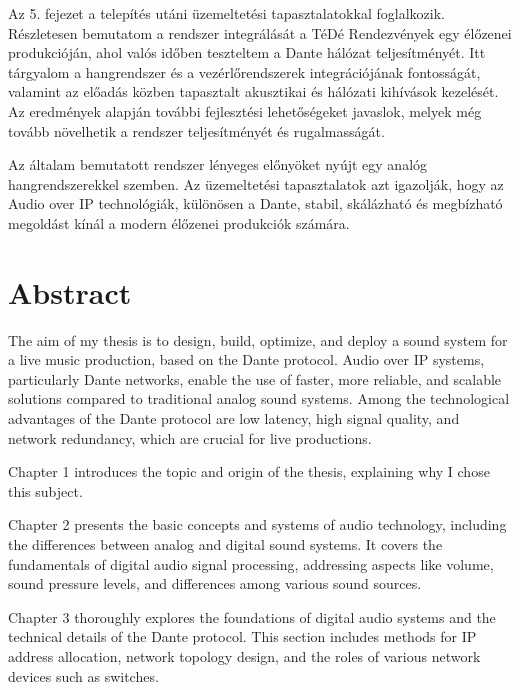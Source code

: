 Az 5. fejezet a telepítés utáni üzemeltetési tapasztalatokkal 
foglalkozik. Részletesen bemutatom a rendszer integrálását a 
TéDé Rendezvények egy élőzenei produkcióján, ahol 
valós időben teszteltem a Dante hálózat teljesítményét. 
Itt tárgyalom a hangrendszer és a vezérlőrendszerek 
integrációjának fontosságát, valamint az előadás közben 
tapasztalt akusztikai és hálózati kihívások kezelését. 
Az eredmények alapján további fejlesztési lehetőségeket 
javaslok, melyek még tovább növelhetik a rendszer teljesítményét és rugalmasságát.

Az általam bemutatott rendszer lényeges előnyöket nyújt egy analóg 
hangrendszerekkel szemben.
Az üzemeltetési tapasztalatok azt igazolják, hogy 
az Audio over IP technológiák, különösen a Dante, 
stabil, skálázható és megbízható megoldást 
kínál a modern élőzenei produkciók számára.


\vfill
\selectenglish


\chapter*{Abstract}

The aim of my thesis is to design, build, optimize, and deploy a sound system 
for a live music production, based on the Dante protocol. 
Audio over IP systems, particularly Dante networks, enable the use 
of faster, more reliable, and scalable solutions compared to 
traditional analog sound systems. Among the technological 
advantages of the Dante protocol are low latency, high signal quality, 
and network redundancy, which are crucial for live productions.

Chapter 1 introduces the topic and origin of the thesis, 
explaining why I chose this subject.

Chapter 2 presents the basic concepts and systems of audio technology, 
including the differences between analog and digital sound systems. 
It covers the fundamentals of digital audio signal processing, 
addressing aspects like volume, sound pressure levels, and differences 
among various sound sources.

Chapter 3 thoroughly explores the foundations of digital audio systems 
and the technical details of the Dante protocol. This section includes 
methods for IP address allocation, network topology design, and the 
roles of various network devices such as switches.

